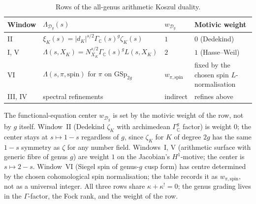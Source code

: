 \begin{table}[h]
\caption{Rows of the all-genus arithmetic Koszul duality.}
\label{v4-arith:ag:table:rows}
\centering
\begin{tabular}{llll}
\toprule
Window & \(\Lambda_{\mathcal{D}_g}(s)\) & \(w_{\mathcal{D}_g}\) & Motivic weight \\
\midrule
II & \(\xi_K(s)=|d_K|^{s/2}\Gamma_{\mathbb{C}}(s)^g\zeta_K(s)\) & \(1\) & \(0\) (Dedekind) \\
I, V & \(\Lambda(s,X_K)=N_{X_K}^{s/2}\Gamma_{\mathbb{C}}(s)^g L(s,X_K)\) & \(2\) & \(1\) (Hasse--Weil) \\
VI & \(\Lambda(s,\pi,\mathrm{spin})\) for \(\pi\) on \(\mathrm{GSp}_{2g}\) & \(w_{\pi,\mathrm{spin}}\) & fixed by the chosen spin \(L\)-normalisation \\
III, IV & spectral refinements & indirect & refines above \\
\bottomrule
\end{tabular}
\end{table}

\begin{remark}
\label{v4-arith:ag:rem:weight}
The functional-equation center \(w_{\mathcal{D}_g}\) is set by the motivic
weight of the row, not by \(g\) itself. Window~II (Dedekind \(\zeta_K\) with
archimedean \(\Gamma_{\mathbb{C}}^g\) factor) is weight \(0\); the center
stays at \(s\mapsto 1-s\) regardless of \(g\), since \(\zeta_K\) for \(K\) of
degree \(2g\) has the same \(1-s\) symmetry as \(\zeta\) for any number field.
Windows~I, V (arithmetic surface with generic fibre of genus \(g\)) are
weight \(1\) on the Jacobian's \(H^1\)-motive; the center is \(s\mapsto 2-s\).
Window~VI (Siegel spin of genus-\(g\) cusp form) has centre determined
by the chosen cohomological spin normalisation; the table records it as
\(w_{\pi,\mathrm{spin}}\), not as a universal integer. All three rows share
\(\kappa+\kappa^!=0\); the genus grading lives in the \(\Gamma\)-factor, the
Fock rank, and the weight of the row.
\end{remark}

